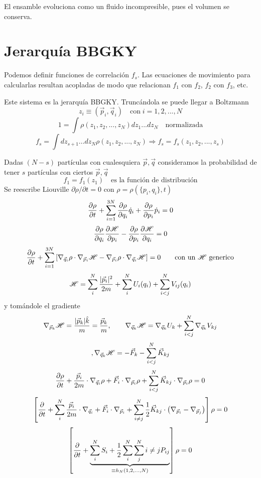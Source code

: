 \documentclass[10pt,oneside]{CBFT_book}
\begin{document}
El ensamble evoluciona como un fluido incompresible, pues el volumen se conserva.

 \section{Jerarquía BBGKY}

Podemos definir funciones de correlación $f_s$. Las ecuaciones de movimiento para calcularlas resultan
acopladas de modo que relacionan $f_1$ con $f_2$, $f_2$ con $f_3$, etc.

Este sistema es la jerarquía BBGKY. Truncándola se puede llegar a Boltzmann
\[
	z_i \equiv ( \vec{p}_i ,\vec{q}_i ) \quad \text{con} \; i = 1,2,...,N
\]
\[
	1 = \int \rho(z_1, z_2, ... ,z_N) dz_1 ... dz_N \quad \text{normalizada}
\]
\[
	f_s = \int dz_{s+1} ... dz_N \rho(z_1, z_2, ... ,z_N) \Rightarrow f_s = f_s(z_1, z_2, ... ,z_s)
\]

Dadas $(N-s)$ partículas con cualesquiera $\vec{p},\vec{q}$ consideramos la probabilidad de tener $s$
partículas con ciertos  $\vec{p},\vec{q}$
\[
	f_1 = f_1(z_1) \quad \text{es la función de distribución}
\]
Se reescribe Liouville $\partial{\rho}/\partial {t} = 0$ con $\rho = \rho( \{ p_i, q_i\},t )$
\[
	\frac{\partial^{\hspace{-0.05em}} {\rho}}{\partial {t}^{\hspace{-0.05em}}} +  \sum_{i=1}^{3N} \frac{\partial^{\hspace{-0.05em}} {\rho}}{\partial {q_i}^{\hspace{-0.05em}}} \dot{q}_i + \frac{\partial^{\hspace{-0.05em}} {\rho}}{\partial {p_i}^{\hspace{-0.05em}}} \dot{p}_i = 0
\]
\[
	\frac{\partial^{\hspace{-0.05em}} {\rho}}{\partial {q_i}^{\hspace{-0.05em}}} \frac{\partial^{\hspace{-0.05em}} {\mathscr{H}}}{\partial {p_i}^{\hspace{-0.05em}}} - \frac{\partial^{\hspace{-0.05em}} {\rho}}{\partial {p_i}^{\hspace{-0.05em}}} \frac{\partial^{\hspace{-0.05em}} {\mathscr{H}}}{\partial {q_i}^{\hspace{-0.05em}}} = 0
\]
\[
	\frac{\partial^{\hspace{-0.05em}} {\rho}}{\partial {t}^{\hspace{-0.05em}}} + \sum_{i=1}^{3N} \left[ \nabla_{\vec{q}_i}\rho \cdot \nabla_{\vec{p}_i}\mathscr{H} -
	\nabla_{\vec{p}_i}\rho \cdot \nabla_{\vec{q}_i}\mathscr{H} \right] = 0 \qquad \text{con un $\mathscr{H}$ generico}
\]
\[
	\mathscr{H} = \sum_i^N \frac{|\vec{p}_i|^2}{2m} + \sum_i^N U_i(q_i)+ \sum_{i<j}^N V_{ij}(q_i)
\]
y tomándole el gradiente
\[
	\nabla_{\vec{p}_k}\mathscr{H} = \frac{|\vec{p}_k|\hat{k}}{m} = \frac{\vec{p}_k}{m},\qquad
	\nabla_{\vec{q}_k}\mathscr{H} = \nabla_{\vec{q}_k}U_k + \sum_{i<j}^N \nabla_{\vec{q}_k} V_{kj}
\]
\[
				, \nabla_{\vec{q}_k}\mathscr{H} = -\vec{F}_k - \sum_{i<j}^N \vec{K}_{kj}
\]
\[
	\frac{\partial^{\hspace{-0.05em}} {\rho}}{\partial {t}^{\hspace{-0.05em}}} + \frac{\vec{p}_i}{2m} \cdot \nabla_{\vec{q}_i}\rho + \vec{F}_i \cdot \nabla_{\vec{p}_i}\rho + 
	\sum_{i<j}^N \vec{K}_{kj}\cdot \nabla_{\vec{p}_i} \rho = 0
\]
\[
	\left[ \frac{\partial^{\hspace{-0.05em}} {}}{\partial {t}^{\hspace{-0.05em}}} + \sum_i^N \frac{\vec{p}_i}{2m} \cdot \nabla_{\vec{q}_i} + 
	\vec{F}_i \cdot \nabla_{\vec{p}_i} + \sum_{i\neq j}^N \frac{1}{2}\vec{K}_{kj}\cdot \left( \nabla_{\vec{p}_i} -
	\nabla_{\vec{p}_j} \right) \right] \rho = 0
\]
\[
	\left[ \frac{\partial^{\hspace{-0.05em}} {}}{\partial {t}^{\hspace{-0.05em}}} + \underbrace{\sum_i^N S_i + \frac{1}{2} \sum_i^N\sum_j^N {i\neq j} P_{ij}}_{\equiv
	h_N(1,2,...,N)} \right] \rho = 0
\]


\end{document}
